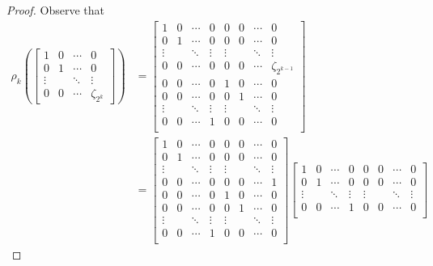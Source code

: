 \documentclass{article}
\theoremstyle{definition}
\theoremstyle{theorem}
\theoremstyle{remark}
\begin{document}
\begin{proof}
Observe that 
\begin{align*}
	\rho_k\left(\begin{bmatrix} 
		1 & 0 & \cdots & 0 \\
		 0 & 1 & \cdots & 0 \\
		\vdots & & \ddots & \vdots \\
		0 & 0 & \cdots & \zeta_{2^k}
	\end{bmatrix}\right) &= 
	\begin{bmatrix} 
		1 & 0 & \cdots & 0 & 0 & 0 & \cdots & 0 \\
		 0 & 1 & \cdots & 0 & 0 & 0 & \cdots & 0 \\
		\vdots & & \ddots & \vdots & \vdots & & \ddots & \vdots \\
		0 & 0 & \cdots & 0 & 0 & 0 & \cdots & \zeta_{2^{k-1}} \\
		0 & 0 & \cdots & 0 & 1 & 0 & \cdots & 0 \\
		0 & 0 & \cdots & 0 & 0 & 1 & \cdots & 0 \\
		\vdots & & \ddots & \vdots & \vdots & & \ddots & \vdots \\
		0 & 0 & \cdots & 1 & 0 & 0 & \cdots & 0 \\
	\end{bmatrix} \\ &=
	\begin{bmatrix} 
		1 & 0 & \cdots & 0 & 0 & 0 & \cdots & 0 \\
		 0 & 1 & \cdots & 0 & 0 & 0 & \cdots & 0 \\
		\vdots & & \ddots & \vdots & \vdots & & \ddots & \vdots \\
		0 & 0 & \cdots & 0 & 0 & 0 & \cdots & 1 \\
		0 & 0 & \cdots & 0 & 1 & 0 & \cdots & 0 \\
		0 & 0 & \cdots & 0 & 0 & 1 & \cdots & 0 \\
		\vdots & & \ddots & \vdots & \vdots & & \ddots & \vdots \\
		0 & 0 & \cdots & 1 & 0 & 0 & \cdots & 0 \\
	\end{bmatrix}
	\begin{bmatrix} 
		1 & 0 & \cdots & 0 & 0 & 0 & \cdots & 0 \\
		 0 & 1 & \cdots & 0 & 0 & 0 & \cdots & 0 \\
		\vdots & & \ddots & \vdots & \vdots & & \ddots & \vdots \\
		0 & 0 & \cdots & 1 & 0 & 0 & \cdots & 0 \\

\end{bmatrix}
\end{align*}
\end{proof}
\end{document}
